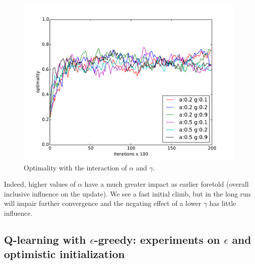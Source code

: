 \documentclass[paper=a4, fontsize=11pt]{scrartcl}
\numberwithin{equation}{section}		%
\numberwithin{figure}{section}			%
\numberwithin{table}{section}				%
\begin{document}
\begin{figure}[H] \centering
\includegraphics[scale=0.5]{alphaGammaOptimality.pdf}
\caption{Optimality with the interaction of $\alpha$ and $\gamma$.} 
\label{figure:alphagammaOpti}
\end{figure}
Indeed, higher values of $\alpha$ have a much greater impact as earlier foretold (overall inclusive influence on the update). We see a fast initial climb, but in the long run will impair further convergence and the negating effect of a lower $\gamma$ has little influence.

\subsection{Q-learning with $\epsilon$-greedy: experiments on $\epsilon$ and optimistic initialization}
\end{document}
